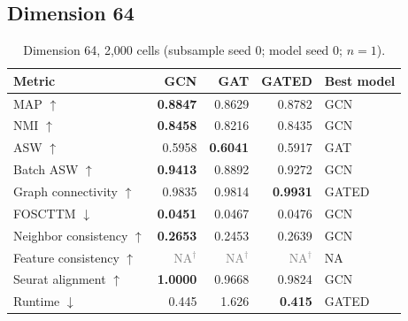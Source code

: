\documentclass[10pt]{article}
\begin{document}
\subsection{Dimension 64}
\begin{table}[H]\centering\small
\caption{Dimension 64, 2,000 cells (subsample seed 0; model seed 0; $n=1$).}
\begin{tabular}{@{}lrrrl@{}}\toprule
Metric & GCN & GAT & GATED & Best model \\\midrule
MAP $\uparrow$ & \textbf{0.8847} & 0.8629 & 0.8782 & GCN \\
NMI $\uparrow$ & \textbf{0.8458} & 0.8216 & 0.8435 & GCN \\
ASW $\uparrow$ & 0.5958 & \textbf{0.6041} & 0.5917 & GAT \\
Batch ASW $\uparrow$ & \textbf{0.9413} & 0.8892 & 0.9272 & GCN \\
Graph connectivity $\uparrow$ & 0.9835 & 0.9814 & \textbf{0.9931} & GATED \\
FOSCTTM $\downarrow$ & \textbf{0.0451} & 0.0467 & 0.0476 & GCN \\
Neighbor consistency $\uparrow$ & \textbf{0.2653} & 0.2453 & 0.2639 & GCN \\
Feature consistency $\uparrow$ & \textcolor{gray}{NA$^{\dagger}$} & \textcolor{gray}{NA$^{\dagger}$} & \textcolor{gray}{NA$^{\dagger}$} & NA \\
Seurat alignment $\uparrow$ & \textbf{1.0000} & 0.9668 & 0.9824 & GCN \\
Runtime $\downarrow$ & 0.445 & 1.626 & \textbf{0.415} & GATED \\
\bottomrule\end{tabular}
\end{table}
\end{document}
